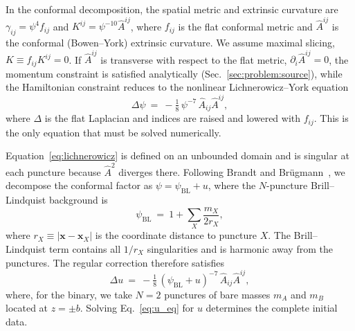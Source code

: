 \documentclass[
  aps,
  prd,
  twocolumn,
  amsmath,
  amssymb,
  nofootinbib,
  superscriptaddress,
  floatfix,
]{revtex4-2}
\newcommand{\psiBL}{\psi_{\mathrm{BL}}}
\newcommand{\Ahat}{\hat{A}}
\begin{document}
In the conformal decomposition, the spatial metric and extrinsic curvature are
$\gamma_{ij} = \psi^4 f_{ij}$ and $K^{ij} = \psi^{-10}\Ahat^{ij}$, where
$f_{ij}$ is the flat conformal metric and $\Ahat^{ij}$ is the conformal
(Bowen--York) extrinsic curvature. We assume maximal slicing,
$K\equiv f_{ij}K^{ij}=0$. If $\Ahat^{ij}$ is transverse with respect to the flat
metric, $\partial_i\Ahat^{ij}=0$, the momentum constraint is satisfied
analytically (Sec.~\ref{sec:problem:source}), while the Hamiltonian constraint
reduces to the nonlinear Lichnerowicz--York equation
\begin{equation}
  \Delta \psi \ = \ -\tfrac{1}{8}\, \psi^{-7}\, \Ahat_{ij}\Ahat^{ij},
  \label{eq:lichnerowicz}
\end{equation}
where $\Delta$ is the flat Laplacian and indices are raised and lowered with
$f_{ij}$. This is the only equation that must be solved numerically.

Equation~\eqref{eq:lichnerowicz} is defined on an unbounded domain and is
singular at each puncture because $\Ahat^2$ diverges there. Following Brandt and
Br\"ugmann~\cite{BrandtBruegmann1997}, we decompose the conformal factor as
$\psi=\psiBL+u$, where the $N$-puncture Brill--Lindquist background is
\begin{equation}
  \psiBL \ = \ 1 + \sum_{X} \frac{m_X}{2 r_X},
  \label{eq:psiBL}
\end{equation}
where $r_X \equiv |\mathbf{x}-\mathbf{x}_X|$ is the coordinate distance to
puncture $X$. The Brill--Lindquist term contains all $1/r_X$ singularities and
is harmonic away from the punctures. The regular correction therefore satisfies
\begin{equation}
  \Delta u \ = \ -\tfrac{1}{8}\,(\psiBL + u)^{-7}\, \Ahat_{ij}\Ahat^{ij},
  \label{eq:u_eq}
\end{equation}
where, for the binary, we take $N=2$ punctures of bare masses $m_A$ and $m_B$
located at $z=\pm b$. Solving Eq.~\eqref{eq:u_eq} for $u$ determines the
complete initial data.
\end{document}
